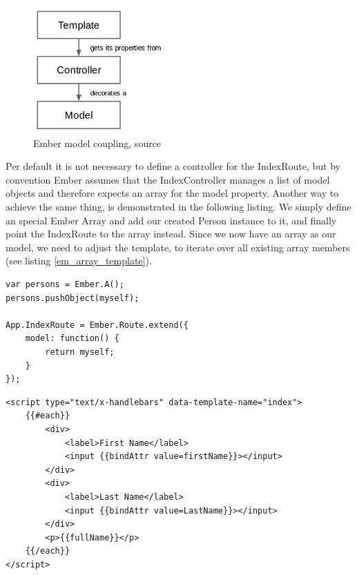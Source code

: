 \begin{figure}
	\centering	\includegraphics[width=0.45\textwidth]{./img/tech-ana/ember_controller_coupling.png}
	\caption{Ember model coupling, source \autocite{tech-ana:em-coupling}}
	\label{fig:ember_coupling}
\end{figure} 
 

Per default it is not necessary to define a controller for the IndexRoute, but by convention Ember assumes that the IndexController manages a list of model objects and therefore expects an array for the model property.
Another way to achieve the same thing, is demonstrated in the following listing.
We simply define an special Ember Array and add our created Person instance to it, and finally point the IndexRoute to the array instead.
Since we now have an array as our model, we need to adjust the template, to iterate over all existing array members (see listing \ref{em_array_template}).

\begin{lstlisting}[caption=app.js]
var persons = Ember.A();
persons.pushObject(myself);

App.IndexRoute = Ember.Route.extend({
    model: function() {
        return myself;
    }
});

\end{lstlisting}     

\begin{lstlisting}[label=em_array_template,caption=index.html]
<script type="text/x-handlebars" data-template-name="index">
	{{#each}}
		<div>
			<label>First Name</label> 
			<input {{bindAttr value=firstName}}></input>
		</div>
		<div>
			<label>Last Name</label> 
			<input {{bindAttr value=LastName}}></input>
		</div>
		<p>{{fullName}}</p>
	{{/each}}
</script>
\end{lstlisting}

